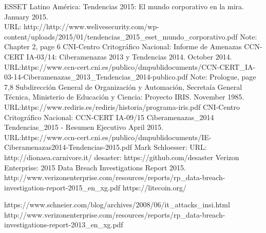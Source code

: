 \documentclass[a4paper]{llncs}
\begin{document}
\begin{thebibliography}{5}
ESSET Latino América:
Tendencias 2015: El mundo corporativo en la mira.
January 2015.\\
URL: http://http://www.welivesecurity.com/wp-content/uploads/2015/01/tendencias\_2015\_eset\_mundo\_corporativo.pdf
Note: Chapter 2, page 6
%
CNI-Centro Critográfico Nacional:
Informe de Amenazas CCN-CERT IA-03/14: Ciberamenazas 2013 y Tendencias 2014.
October 2014.\\
URL:https://www.ccn-cert.cni.es/publico/dmpublidocuments/CCN-CERT\_IA-03-14-Ciberamenazas\_2013\_Tendencias\_2014-publico.pdf
Note: Prologue, page 7,8
%
Subdirección General de Organización y Automación, Secretaía General Técnica, Ministerio de Educación y Ciencia:
Proyecto IRIS.
November 1985.\\
URL:https://www.rediris.es/rediris/historia/programa-iris.pdf
%
CNI-Centro Critográfico Nacional:
CCN-CERT IA-09/15 Ciberamenazas\_2014 Tendencias\_2015 - Resumen Ejecutivo
April 2015.\\
URL:https://www.ccn-cert.cni.es/publico/dmpublidocuments/IE-Ciberamenazas2014-Tendencias-2015.pdf
%
Mark Schloesser:
URL: http://dionaea.carnivore.it/
%
desaster:
https://github.com/desaster
%
Verizon Enterprise:
2015 Data Breach Investigations Report
2015.\\
http://www.verizonenterprise.com/resources/reports/rp\_data-breach-investigation-report-2015\_en\_xg.pdf
%
https://litecoin.org/
%
\end{thebibliography}
https://www.schneier.com/blog/archives/2008/06/it\_attacks\_insi.html
http://www.verizonenterprise.com/resources/reports/rp\_data-breach-investigations-report-2013\_en\_xg.pdf
\end{document}
